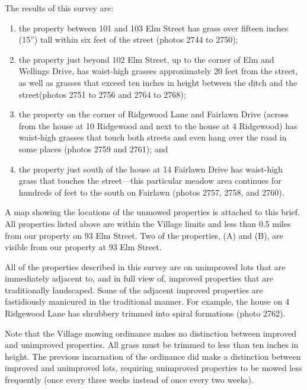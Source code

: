 \documentclass[12pt]{article}
\begin{document}
The results of this survey are:
\renewcommand{\labelenumi}{(\Alph{enumi})}
\begin{enumerate}
\item the property between 101 and 103 Elm Street has grass over fifteen inches (15'') tall within six feet of the street (photos 2744 to 2750);
\item the property just beyond 102 Elm Street, up to the corner of Elm and Wellings Drive, has waist-high grasses approximately 20 feet from the street, as well as grasses that exceed ten inches in height between the ditch and the street(photos 2751 to 2756 and 2764 to 2768);
\item the property on the corner of Ridgewood Lane and Fairlawn Drive (across from the house at 10 Ridgewood and next to the house at 4 Ridgewood) has waist-high grasses that touch both streets and even hang over the road in some places (photos 2759 and 2761); and
\item the property just south of the house at 14 Fairlawn Drive has waist-high grass that touches the street---this particular meadow area continues for hundreds of feet to the south on Fairlawn (photos 2757, 2758, and 2760).
\end{enumerate}
A map showing the locations of the unmowed properties is attached to this brief.
All properties listed above are within the Village limits and less than 0.5 miles from our property on 93 Elm Street.
Two of the properties, (A) and (B), are visible from our property at 93 Elm Street. 

All of the properties described in this survey are on unimproved lots that are immediately adjacent to, and in full view of, improved properties that are traditionally landscaped.
Some of the adjacent improved properties are fastidiously manicured in the traditional manner.
For example, the house on 4 Ridgewood Lane has shrubbery trimmed into spiral formations (photo 2762).


Note that the Village mowing ordinance makes no distinction between improved and unimproved properties.
All grass must be trimmed to less than ten inches in height.
The previous incarnation of the ordinance did make a distinction between improved and unimproved lots, requiring unimproved properties to be mowed less frequently (once every three weeks instead of once every two weeks).  
\end{document}
